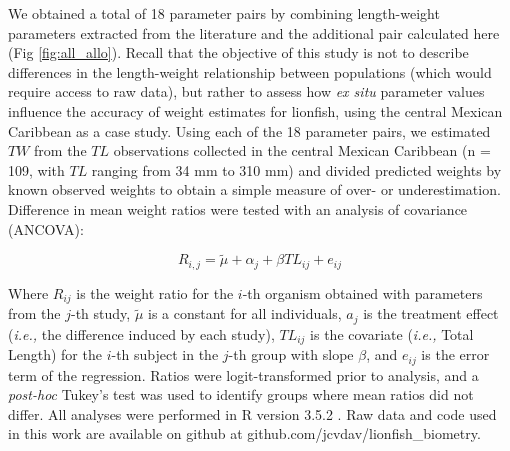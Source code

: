 \documentclass[fleqn,10pt,lineno]{wlpeerj} %
\begin{document}
We obtained a total of 18 parameter pairs by combining length-weight
parameters extracted from the literature and the additional pair
calculated here (Fig \ref{fig:all_allo}). Recall that the objective of
this study is not to describe differences in the length-weight
relationship between populations (which would require access to raw
data), but rather to assess how \emph{ex situ} parameter values
influence the accuracy of weight estimates for lionfish, using the
central Mexican Caribbean as a case study. Using each of the 18
parameter pairs, we estimated \(TW\) from the \(TL\) observations
collected in the central Mexican Caribbean (n = 109, with \(TL\) ranging
from 34 mm to 310 mm) and divided predicted weights by known observed
weights to obtain a simple measure of over- or underestimation.
Difference in mean weight ratios were tested with an analysis of
covariance (ANCOVA):

\begin{equation}
R_{i,j} = \tilde{\mu} + \alpha_j + \beta TL_{ij} + e_{ij}
\end{equation}

\clearpage

Where \(R_{ij}\) is the weight ratio for the \(i\)-th organism obtained
with parameters from the \(j\)-th study, \(\tilde{\mu}\) is a constant
for all individuals, \(a_j\) is the treatment effect (\emph{i.e.,} the
difference induced by each study), \(TL_{ij}\) is the covariate
(\emph{i.e.,} Total Length) for the \(i\)-th subject in the \(j\)-th
group with slope \(\beta\), and \(e_{ij}\) is the error term of the
regression. Ratios were logit-transformed prior to analysis, and a
\emph{post-hoc} Tukey's test was used to identify groups where mean
ratios did not differ. All analyses were performed in R version 3.5.2
\citep{rcore_2018}. Raw data and code used in this work are available on
github at github.com/jcvdav/lionfish\_biometry.
\end{document}
